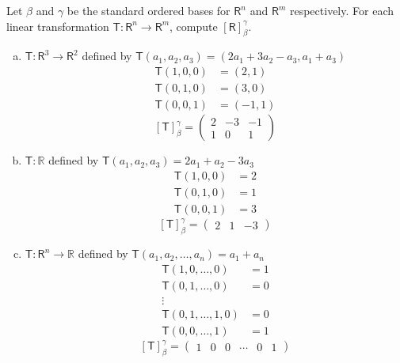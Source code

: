 Let $\beta$ and $\gamma$ be the standard ordered bases for
$\mathsf{R}^n$ and $\mathsf{R}^m$ respectively. For each linear
transformation $\mathsf{T}\colon\mathsf{R}^n\to\mathsf{R}^m$, compute $\left[\mathsf{R}\right]^\gamma_\beta$.
\begin{enumerate}[(a)]
\addtocounter{enumii}{1}
\item $\mathsf{T}\colon\mathsf{R}^3\to \mathsf{R}^2$ defined by
  $\mathsf{T}(a_1,a_2,a_3) = (2a_1 + 3a_2 -a_3, a_1 +a_3)$
\begin{align}
\mathsf{T}(1,0,0) &= (2,1)\\
\mathsf{T}(0,1,0) &= (3,0)\\
\mathsf{T}(0,0,1) &= (-1,1)
\end{align}
\begin{equation}
\left[\mathsf{T}\right]^\gamma_\beta = \begin{pmatrix}
2 & -3 & -1\\
1 & 0 & 1
  \end{pmatrix}
\end{equation}
\item $\mathsf{T}\colon\mathbb{R}$ defined by $\mathsf{T}(a_1,a_2,a_3)
  = 2a_1 + a_2 -3a_3$
\begin{align}
\mathsf{T}(1,0,0) &= 2\\
\mathsf{T}(0,1,0) &= 1\\
\mathsf{T}(0,0,1) &= 3
\end{align}
\begin{equation}
\left[\mathsf{T}\right]^\gamma_\beta = \begin{pmatrix}
2 & 1 & -3
  \end{pmatrix}
\end{equation}
\addtocounter{enumii}{3}
\item $\mathsf{T}\colon\mathsf{R}^n \to \mathbb{R}$ defined by
  $\mathsf{T}(a_1,a_2,\dots,a_n) = a_1 + a_n$
\begin{align}
\mathsf{T}(1,0,\dots,0) &=1\\
\mathsf{T}(0,1,\dots,0)&=0\\
\vdots&\\
\mathsf{T}(0,1,\dots,1,0)&=0\\
\mathsf{T}(0,0,\dots,1)&=1
\end{align}
\begin{equation}
\left[\mathsf{T}\right]^\gamma_\beta = \begin{pmatrix}
1 & 0 & 0 & \cdots & 0 & 1
  \end{pmatrix}
\end{equation}


\end{enumerate}
